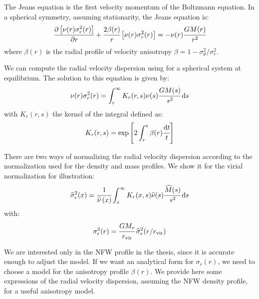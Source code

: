 The Jeans equation is the first velocity momentum of the Boltzmann equation. In a
spherical symmetry, assuming stationarity, the Jeans equation is:
%
\begin{equation}
    \label{eq:jeans}
    \cfrac{{\partial} \left[\nu(r)\sigma_r^2(r)\right]}{{\partial} r} +
    \cfrac{2\beta(r)}{r}\left[\nu(r)\sigma_r^2(r)\right]=
    -\nu(r)\cfrac{GM(r)}{r^2}
\end{equation}
%
where $\beta \left(r\right)$ is the radial profile of velocity anisotropy
$\beta = 1 - \sigma_\theta^2/\sigma_r^2$.

We can compute the radial velocity dispersion using  for
a spherical system at equilibrium. The solution to this equation is given by:
%
\begin{equation}
    \nu(r)\sigma_r^2(r)=
    \int_r^\infty K_r(r,s)\nu(s)\cfrac{GM(s)}{s^2}\,{\rm{d}}{s}
\end{equation}
%
with $K_r(r,s)$ the kernel of the integral defined as:
%
\begin{equation}
    K_r(r,s)=\exp\left[2\int_r^s\beta(r)\cfrac{{\rm{d}}{t}}{t}\right]
\end{equation}

There are two ways of normalizing the radial velocity dispersion according to
the normalization used for the density and mass profiles. We show it for the
virial normalization for illustration:
%
\begin{equation}
    \label{eq:sigma_norm}
    \widehat\sigma_r^2(x)= \cfrac{1}{\widehat\nu \left(x\right)}
    \int_x^\infty K_r(x,s)\widehat\nu(s)\cfrac{\widehat{M}(s)}{s^2}\,{\rm{d}} s
\end{equation}
%
with:
%
\begin{equation}
    \sigma_r^2(r) = \cfrac{GM_v}{r_{\rm vir}}\,\widehat\sigma_r^2(r/r_{\rm vir})
\end{equation}

We are interested only in the NFW profile in the thesis, since it is accurate
enough to adjust the model. If we want an analytical form for $\sigma_r
\left(r\right)$, we need to choose a model for the anisotropy profile $\beta
\left(r\right)$. We provide here some expressions of the radial velocity
dispersion, assuming the NFW density profile, for a useful anisotropy model.

\subsection{\citet{ML+05}}
\label{sub:ml05}

